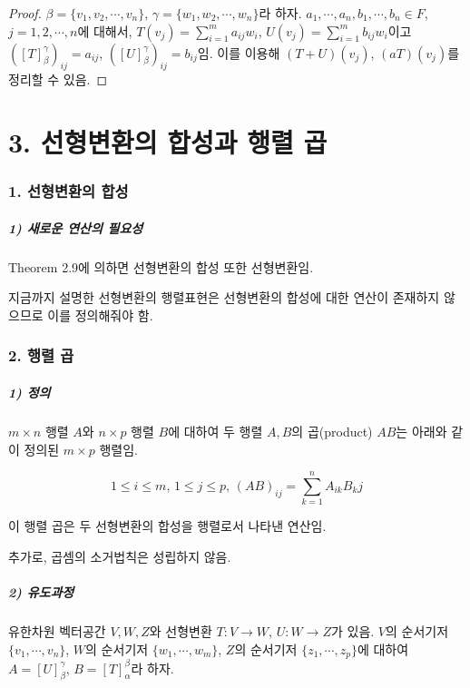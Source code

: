 \begin{proof}
$\beta = \{v_1,v_2, \cdots ,v_n\}$, $\gamma = \{w_1,w_2, \cdots ,w_n\}$라 하자. $a_1, \cdots ,a_n, b_1, \cdots ,b_n \in F$, $j=1,2, \cdots ,n$에 대해서, $T(v_j)=\sum_{i=1}^{m}{a_{ij}w_i}$, $U(v_j)=\sum_{i=1}^{m}{b_{ij}w_i}$이고 $([T]_{\beta}^{\gamma})_{ij}=a_{ij}$, $([U]_{\beta}^{\gamma})_{ij}=b_{ij}$임. 이를 이용해 $(T+U)(v_j)$, $(aT)(v_j)$를 정리할 수 있음.
\end{proof}


\newpage


\part*{3. 선형변환의 합성과 행렬 곱}

\section*{1. 선형변환의 합성}

\subsubsection*{1) 새로운 연산의 필요성}
Theorem 2.9에 의하면 선형변환의 합성 또한 선형변환임.

지금까지 설명한 선형변환의 행렬표현은 선형변환의 합성에 대한 연산이 존재하지 않으므로 이를 정의해줘야 함.\\


\section*{2. 행렬 곱}

\subsubsection*{1) 정의\\}
\begin{DEF}
$m \times n$ 행렬 $A$와 $n \times p$ 행렬 $B$에 대하여 두 행렬 $A,B$의 곱(product) $AB$는 아래와 같이 정의된 $m \times p$ 행렬임.

\[
1 \leq i \leq m,\,1 \leq j \leq p,\,(AB)_{ij}= \sum^{n}_{k=1}A_{ik}B_kj
\]
\end{DEF}

이 행렬 곱은 두 선형변환의 합성을 행렬로서 나타낸 연산임.

추가로, 곱셈의 소거법칙은 성립하지 않음.

\subsubsection*{2) 유도과정}
유한차원 벡터공간 $V,W,Z$와 선형변환 $T:V \rightarrow W$, $U:W \rightarrow Z$가 있음. $V$의 순서기저 $\{v_1, \cdots , v_n\}$, $W$의 순서기저 $\{w_1, \cdots , w_m\}$, $Z$의 순서기저 $\{z_1, \cdots , z_p\}$에 대하여 $A=[U]^{\gamma}_{\beta}$, $B=[T]^{\beta}_{\alpha}$라 하자.

